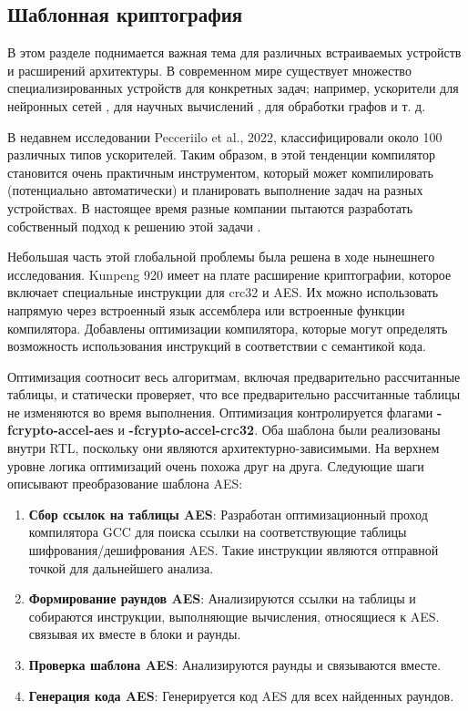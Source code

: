 \subsection{Шаблонная криптография}
В этом разделе поднимается важная тема для различных встраиваемых устройств и расширений архитектуры. В современном мире существует множество специализированных устройств для конкретных задач; например, ускорители для нейронных сетей \cite{chen2020survey}, для научных вычислений \cite{weber2010comparing}, для обработки графов \cite{rahman2020graphpulse} и т. д.

В недавнем исследовании \cite{peccerillo2022survey} Pecceriilo et al., 2022, классифицировали около 100 различных типов
ускорителей. Таким образом, в этой тенденции компилятор становится очень практичным инструментом, который может компилировать (потенциально автоматически) и планировать выполнение задач на разных устройствах. В настоящее время разные компании пытаются разработать собственный подход к решению этой задачи \cite{tavarageri2019automatic,chen2022case,kovac2022towards}.

Небольшая часть этой глобальной проблемы была решена в ходе нынешнего исследования. Kunpeng 920 имеет на плате расширение криптографии, которое включает специальные инструкции для crc32 и AES. Их можно использовать напрямую через встроенный язык ассемблера или встроенные функции компилятора. Добавлены оптимизации компилятора, которые могут определять возможность использования инструкций в соответствии с семантикой кода.

Оптимизация соотносит весь алгоритмам, включая предварительно рассчитанные таблицы, и статически проверяет, что все предварительно рассчитанные таблицы не изменяются во время выполнения. Оптимизация контролируется флагами \textbf{-fcrypto-accel-aes} и \textbf{-fcrypto-accel-crc32}. Оба шаблона были реализованы внутри RTL, поскольку они являются  архитектурно-зависимыми. На верхнем уровне логика оптимизаций очень похожа друг на друга. Следующие шаги описывают преобразование шаблона AES:

\begin{enumerate}
	\item \textbf{Сбор ссылок на таблицы AES}: Разработан оптимизационный проход  компилятора GCC для поиска ссылки на соответствующие таблицы шифрования/дешифрования AES. Такие инструкции являются отправной точкой для дальнейшего анализа.
	\item \textbf{Формирование раундов AES}: Анализируются ссылки на таблицы и собираются инструкции, выполняющие вычисления, относящиеся к AES. связывая их вместе в блоки и раунды.
	\item \textbf{Проверка шаблона AES}: Анализируются раунды и связываются вместе.
	\item \textbf{Генерация кода AES}: Генерируется код AES для всех найденных раундов.
\end{enumerate}

